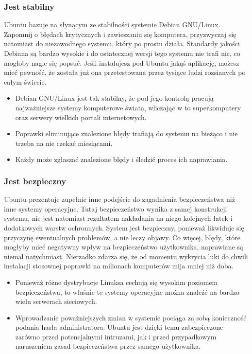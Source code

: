 \subsubsection{Jest stabilny}
Ubuntu bazuje na słynącym ze stabilności systemie Debian GNU/Linux. Zapomnij o błędach krytycznych i zawieszaniu się komputera, przyzwyczaj się natomiast do niezawodnego systemu, który po prostu działa. Standardy jakości Debiana są bardzo wysokie i do ostatecznej wersji tego systemu nie trafi nic, co mogłoby nagle się popsuć. Jeśli instalujesz pod Ubuntu jakąś aplikację, możesz mieć pewność, że została już ona przetestowana przez tysiące ludzi rozsianych po całym świecie.
\begin{itemize}
\item Debian GNU/Linux jest tak stabilny, że pod jego kontrolą pracują najważniejsze systemy komputerowe świata, wliczając w to superkomputery oraz serwery wielkich portali internetowych.
\item Poprawki eliminujące znalezione błędy trafiają do systemu na bieżąco i nie trzeba na nie czekać miesiącami.
\item Każdy może zgłaszać znalezione błędy i śledzić proces ich naprawiania.
\end{itemize}
\subsubsection{Jest bezpieczny}
Ubuntu prezentuje zupełnie inne podejście do zagadnienia bezpieczeństwa niż inne systemy operacyjne. Tutaj bezpieczeństwo wynika z samej konstrukcji systemu, nie jest natomiast rezultatem nakładania na niego kolejnych łatek i dodatkowych warstw ochronnych. System jest bezpieczny, ponieważ likwiduje się przyczynę ewentualnych problemów, a nie leczy objawy. Co więcej, błędy, które mogłyby mieć negatywny wpływ na bezpieczeństwo użytkownika, naprawiane są niemal natychmiast. Nierzadko zdarza się, że od momentu wykrycia luki do chwili instalacji stosownej poprawki na milionach komputerów mija mniej niż doba.
\begin{itemize}
\item Ponieważ różne dystrybucje Linuksa cechują się wysokim poziomem bezpieczeństwa, to właśnie te systemy operacyjne można znaleźć na bardzo wielu serwerach sieciowych.
\item Wprowadzanie poważniejszych zmian w systemie pociąga za sobą konieczność podania hasła administratora. Ubuntu jest dzięki temu zabezpieczone zarówno przed potencjalnymi intruzami, jak i przed przypadkowym naruszeniem zasad bezpieczeństwa przez samego użytkownika.
\end{itemize}
